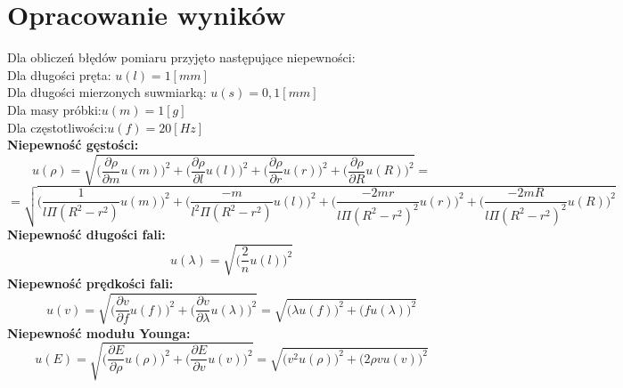 \documentclass[a4paper,11pt]{article}
\begin{document}
\section{Opracowanie wyników}
	Dla obliczeń błędów pomiaru przyjęto następujące niepewności:\\
	Dla długości pręta: $u(l)=1 [mm]$\\
	Dla długości mierzonych suwmiarką: $u(s)=0,1[mm]$\\
	Dla masy próbki:$u(m)=1 [g]$\\
	Dla częstotliwości:$u(f)=20 [Hz]$\\
	$$$$
	\textbf{Niepewność gęstości:}
	$$ u(\rho)=\sqrt{\bigg(\frac{\partial \rho}{\partial m}u(m)\bigg)^2+\bigg(\frac{\partial \rho}{\partial l}u(l)\bigg)^2+\bigg(\frac{\partial \rho}{\partial r}u(r)\bigg)^2+\bigg(\frac{\partial \rho}{\partial R}u(R)\bigg)^2} = $$ $$ = \sqrt{\bigg(\frac{1}{l\Pi (R^2-r^2)}u(m)\bigg)^2+\bigg(\frac{-m}{l^2 \Pi(R^2-r^2)}u(l)\bigg)^2+\bigg(\frac{-2mr}{l\Pi (R^2-r^2)^2}u(r)\bigg)^2+\bigg(\frac{-2mR}{l\Pi (R^2-r^2)^2}u(R)\bigg)^2}$$
	$$$$
\textbf{Niepewność długości fali:}
	$$ u(\lambda)=\sqrt{\bigg(\frac{2}{n}u(l)\bigg)^2}$$
	\textbf{Niepewność prędkości fali:}
	$$ u(v)=\sqrt{\bigg(\frac{\partial v}{\partial f}u(f)\bigg)^2+\bigg(\frac{\partial v}{\partial \lambda}u(\lambda)\bigg)^2}=\sqrt{\bigg(\lambda u(f)\bigg)^2+\bigg(f u(\lambda)\bigg)^2}$$
	$$$$
	\textbf{Niepewność modułu Younga:}
	$$ u(E)=\sqrt{\bigg(\frac{\partial E}{\partial \rho}u(\rho)\bigg)^2+\bigg(\frac{\partial E}{\partial v}u(v)\bigg)^2} =
	\sqrt{\bigg(v^2 u(\rho)\bigg)^2+\bigg(2 \rho v u(v)\bigg)^2}$$
	
\begin{table}[!htbp]
\end{table}
\end{document}
